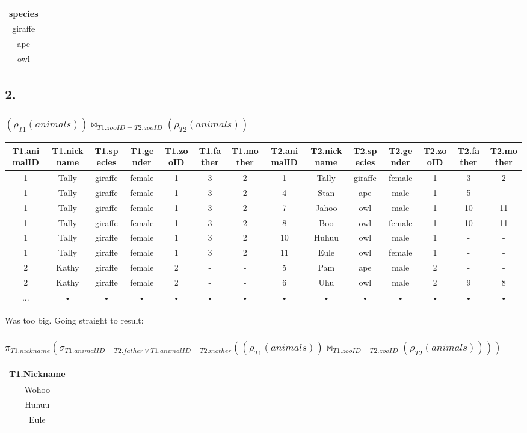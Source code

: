 \documentclass[10pt,a4paper,final]{report}
\begin{document}
\begin{tabular}{|c|}
\hline 
species \\  
\hline 
giraffe \\
\hline 
ape \\ 
\hline 
owl \\
\hline 
\end{tabular}

\subsection*{2.}
\subsubsection*{$(\rho_{T1}(animals)) \Join_{T1.zooID = T2.zooID} (\rho_{T2}(animals))$}
\begin{tabular}{|c|c|c|c|c|c|c|c|c|c|c|c|c|c|}
\hline 
T1.animalID & T1.nickname & T1.species & T1.gender & T1.zooID & T1.father & T1.mother & T2.animalID & T2.nickname & T2.species & T2.gender & T2.zooID & T2.father & T2.mother \\ 
\hline 
1 & Tally & giraffe & female & 1 & 3 & 2 & 1 & Tally & giraffe & female & 1 & 3 & 2 \\ 
\hline 
1 & Tally & giraffe & female & 1 & 3 & 2 & 4 & Stan & ape & male & 1 & 5 & - \\ 
\hline 
1 & Tally & giraffe & female & 1 & 3 & 2 & 7 & Jahoo & owl & male & 1 & 10 & 11 \\ 
\hline 
1 & Tally & giraffe & female & 1 & 3 & 2 & 8 & Boo & owl & female & 1 & 10 & 11 \\ 
\hline 
1 & Tally & giraffe & female & 1 & 3 & 2 & 10 & Huhuu & owl & male & 1 & - & - \\ 
\hline 
1 & Tally & giraffe & female & 1 & 3 & 2 & 11 & Eule & owl & female & 1 & - & - \\ 
\hline 
2 & Kathy & giraffe & female & 2 & - & - & 5 & Pam & ape & male & 2 & - & - \\ 
\hline 
2 & Kathy & giraffe & female & 2 & - & - & 6 & Uhu & owl & male & 2 & 9 & 8 \\ 
\hline 
... & • & • & • & • & • & • & • & • & • & • & • & • & • \\ 
\hline 
\end{tabular} 
Was too big. Going straight to result:

\subsubsection*{$\pi_{T1.nickname} ( \sigma_{T1.animalID = T2.father \lor T1.animalID = T2.mother}((\rho_{T1}(animals)) \Join_{T1.zooID = T2.zooID} (\rho_{T2}(animals))))$}
\begin{tabular}{|c|}
\hline 
T1.Nickname \\ 
\hline 
Wohoo \\ 
\hline 
Huhuu \\ 
\hline 
Eule \\ 
\hline 
\end{tabular} 
\end{document}
